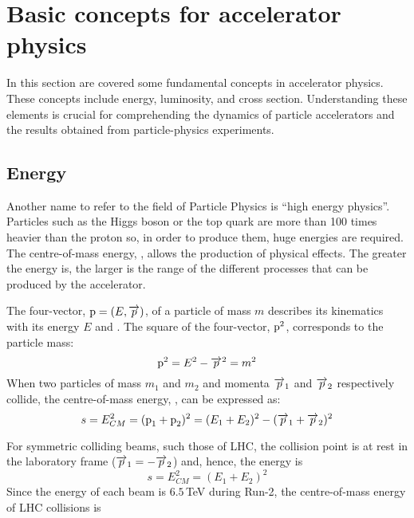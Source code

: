 \section{Basic concepts for accelerator physics}
\label{sec:Chap2:LHC:lumi}

In this section are covered some fundamental concepts in accelerator physics. 
These concepts include energy, luminosity, and cross section. Understanding 
these elements is crucial for comprehending the dynamics of particle accelerators 
and the results obtained from particle-physics experiments. 


\subsection{Energy}
\label{sec:Chap1:LHC:Energy}
Another name to refer to the field of Particle Physics is ``high energy physics''. Particles such as the Higgs boson or the top quark are 
more than 100 times heavier than the proton so, in order to produce them, huge energies are required.
The centre-of-mass energy, \CM, allows the production of physical effects. The greater the energy is, 
the larger is the range of the different processes that can be produced by the accelerator. 

The four-vector, $\boldsymbol{\textrm{p}}  =  (E, \overrightarrow{p})$, of a particle of mass $m$ describes its kinematics with its energy $E$ and \momentum.
The square of the four-vector, $\boldsymbol{\textrm{p}}^2$, corresponds to the particle mass:
\begin{equation}
	\boldsymbol{\textrm{p}}^2 = E^2 - \overrightarrow{p}^2 = m^2
\end{equation}
When two particles of mass $m_1$ and $m_2$  and momenta $\overrightarrow{p}_1$ and $\overrightarrow{p}_2$ respectively collide, the centre-of-mass energy,
\CM, can be expressed as:
\begin{equation}\label{eq:Chap2:EnergyGeneral}
	s = E^{2}_{CM} = (\boldsymbol{\textrm{p}}_1 + \boldsymbol{\textrm{p}}_2)^2 = (E_1 +E_2)^2 - (\overrightarrow{p}_1 +  \overrightarrow{p}_2)^2
\end{equation}

For symmetric colliding beams, such those of LHC, the collision point is at rest in the laboratory frame ($\overrightarrow{p}_1 = -\overrightarrow{p}_2$) and, hence, 
the energy is 
\begin{equation}
	s = E^{2}_{CM} = (E_1 +E_2)^2 
\end{equation}
Since the  energy of each beam is $6.5\,$TeV during Run-2, the centre-of-mass energy of LHC collisions is %

